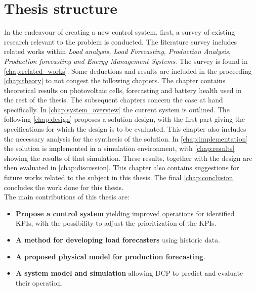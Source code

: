 \section{Thesis structure}
 In the endeavour of creating a new control system, first, a survey of existing research relevant to the problem is conducted. The literature survey includes related works within \textit{Load analysis, Load Forecasting, Production Analysis, Production forecasting and Energy Management Systems}. The survey is found in \autoref{chap:related_works}. Some deductions and results are included in the proceeding \autoref{chap:theory} to not congest the following chapters. The chapter contains theoretical results on photovoltaic cells, forecasting and battery health used in the rest of the thesis. The subsequent chapters concern the case at hand specifically. In \autoref{chap:system_overview} the current system is outlined. The following \autoref{chap:design} proposes a solution design, with the first part giving the specifications for which the design is to be evaluated. This chapter also includes the necessary analysis for the synthesis of the solution. In \autoref{chap:implementation} the solution is implemented in a simulation environment, with \autoref{chap:results} showing the results of that simulation. These results, together with the design are then evaluated in \autoref{chap:discussion}. This chapter also contains suggestions for future works related to the subject in this thesis. The final \autoref{chap:conclusion} concludes the work done for this thesis.\\

 The main contributions of this thesis are:
\begin{itemize}
    \item \textbf{Propose a control system} yielding improved operations for identified KPIs, with the possibility to adjust the prioritization of the KPIs. 
    \item \textbf{A method for developing load forecasters} using historic data.
    \item \textbf{A proposed physical model for production forecasting}.
    \item \textbf{A system model and simulation} allowing DCP to predict and evaluate their operation.
\end{itemize}
